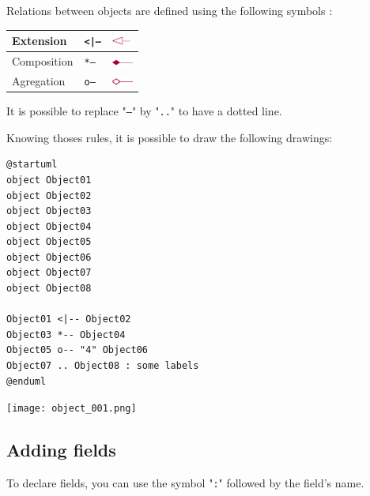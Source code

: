 \begin{description}
\item Relations between objects are defined using the following symbols : 

\begin{tabular}{|l|l|l|} \hline
Extension & \texttt{<|--} & 
\includegraphics[width=6mm]{img/extends01.png}

\\ \hline
Composition & \texttt{*--} &
\includegraphics[width=7mm]{img/sym03.png}

\\ \hline
Agregation & \texttt{o--} &
\includegraphics[width=7mm]{img/sym01.png}

\\ \hline
\end{tabular}

\item It is possible to replace "\texttt{--}" by "\texttt{..}" to have a dotted
line.

\item Knowing thoses rules, it is possible to draw the following drawings: 
\end{description}

\begin{lstlisting}
@startuml
object Object01
object Object02
object Object03
object Object04
object Object05
object Object06
object Object07
object Object08

Object01 <|-- Object02
Object03 *-- Object04
Object05 o-- "4" Object06
Object07 .. Object08 : some labels
@enduml
\end{lstlisting}
\begin{center}
\texttt{[image: object\_001.png]}
\end{center}

\newpage \subsection{Adding fields}

To declare fields, you can use the symbol "\texttt{:}" followed by the field's
name.

